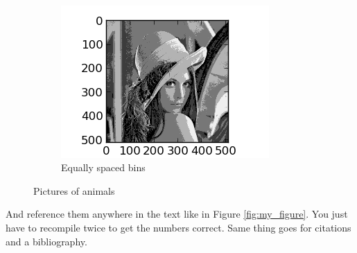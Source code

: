 \documentclass{article}
\begin{document}
\begin{figure}
\begin{subfigure}[b]{0.3\textwidth}
                    \label{fig:compressed}
            \end{subfigure}
            ~ %
            \begin{subfigure}[b]{0.3\textwidth}
                    \centering
                    \includegraphics[width=\textwidth]{equal_bins.png}
                    \caption{Equally spaced bins}
                    \label{fig:equal_bins}
            \end{subfigure}
            \caption{Pictures of animals}\label{fig:images}
    \end{figure}

	And reference them anywhere in the text like in Figure \ref{fig:my_figure}. You just have to recompile twice to get the numbers 
	correct. Same thing goes for citations and a bibliography.
	
\end{document}
